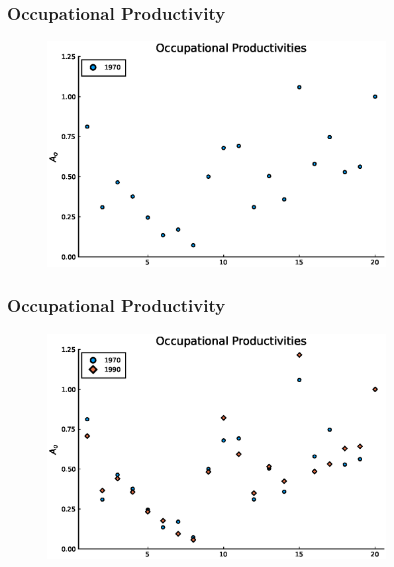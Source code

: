 \documentclass[11pt]{beamer}
\begin{document}
\begin{frame}
\frametitle{Occupational Productivity}
\label{aggprod}
\begin{figure}
\begin{center}
\includegraphics[width=0.8\textwidth]{plots/A_men_70.eps}
\label{ }
\end{center}
\end{figure}
\end{frame}

\begin{frame}
\frametitle{Occupational Productivity}
\begin{figure}
\begin{center}
\includegraphics[width=0.8\textwidth]{plots/A_men_70_90.eps}
\label{ }
\end{center}
\end{figure}
\end{frame}
\end{document}
